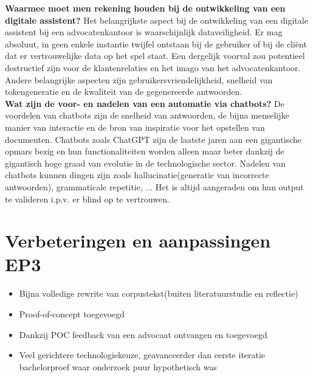 \textbf{Waarmee moet men rekening houden bij de ontwikkeling van een digitale assistent?}
Het belangrijkste aspect bij de ontwikkeling van een digitale assistent bij een advocatenkantoor is waarschijnlijk dataveiligheid.
Er mag absoluut, in geen enkele instantie twijfel ontstaan bij de gebruiker of bij de cliënt dat er vertrouwelijke data op het spel staat.
Een dergelijk voorval zou potentieel destructief zijn voor de klantenrelaties en het imago van het advocatenkantoor.
Andere belangrijke aspecten zijn gebruikersvriendelijkheid, snelheid van tokengeneratie en de kwaliteit van de gegenereerde antwoorden.\\

\textbf{Wat zijn de voor- en nadelen van een automatie via chatbots?}
De voordelen van chatbots zijn de snelheid van antwoorden, de bijna menselijke manier van interactie en de bron van inspiratie voor het opstellen van documenten.
Chatbots zoals ChatGPT zijn de laatste jaren aan een gigantische opmars bezig en hun functionaliteiten worden alleen maar beter dankzij de gigantisch hoge graad van evolutie in de technologische sector.
Nadelen van chatbots kunnen dingen zijn zoals hallucinatie(generatie van incorrecte antwoorden), grammaticale repetitie, ...
Het is altijd aangeraden om hun output te valideren i.p.v. er blind op te vertrouwen.

\section{Verbeteringen en aanpassingen EP3}
\begin{itemize}
	\item Bijna volledige rewrite van corpustekst(buiten literatuurstudie en reflectie)
	\item Proof-of-concept toegevoegd
	\item Dankzij POC feedback van een advocaat ontvangen en toegevoegd
	\item Veel gerichtere technologiekeuze, geavanceerder dan eerste iteratie bachelorproef waar onderzoek puur hypothetisch was
\end{itemize}
